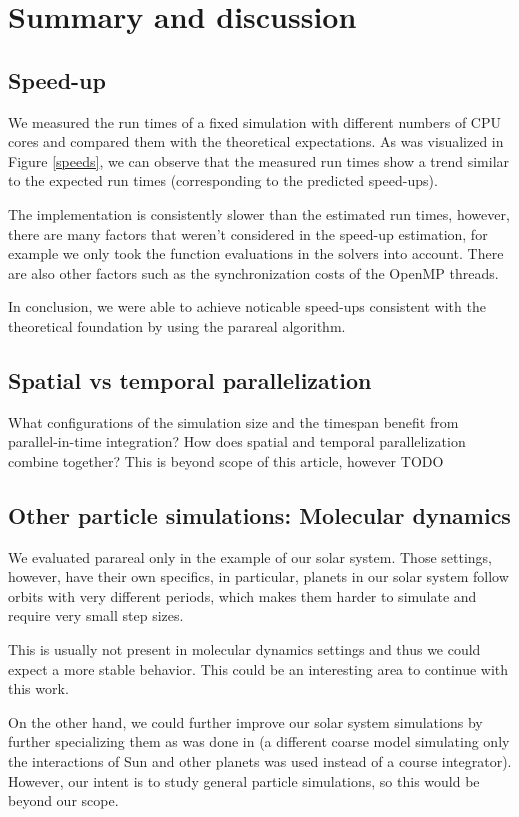 \documentclass[conference]{IEEEtran}
\begin{document}
\section{Summary and discussion}

\subsection{Speed-up}
We measured the run times of a fixed simulation with different numbers of CPU cores and compared them with the theoretical expectations. As was visualized in Figure \ref{speeds}, we can observe that the measured run times show a trend similar to the expected run times (corresponding to the predicted speed-ups). 

The implementation is consistently slower than the estimated run times, however, there are many factors that weren't considered in the speed-up estimation, for example we only took the function evaluations in the solvers into account. There are also other factors such as the synchronization costs of the OpenMP threads.

In conclusion, we were able to achieve noticable speed-ups consistent with the theoretical foundation by using the parareal algorithm.

\subsection{Spatial vs temporal parallelization}
What configurations of the simulation size and the timespan benefit from parallel-in-time integration? How does spatial and temporal parallelization combine together? This is beyond scope of this article, however {\color{red} TODO}

\subsection{Other particle simulations: Molecular dynamics}
We evaluated parareal only in the example of our solar system. Those settings, however, have their own specifics, in particular, planets in our solar system follow orbits with very different periods, which makes them harder to simulate and require very small step sizes. 

This is usually not present in molecular dynamics settings and thus we could expect a more stable behavior. This could be an interesting area to continue with this work.

On the other hand, we could further improve our solar system simulations by further specializing them as was done in \cite{parallelsolar} (a different coarse model simulating only the interactions of Sun and other planets was used instead of a course integrator). However, our intent is to study general particle simulations, so this would be beyond our scope.
\end{document}
